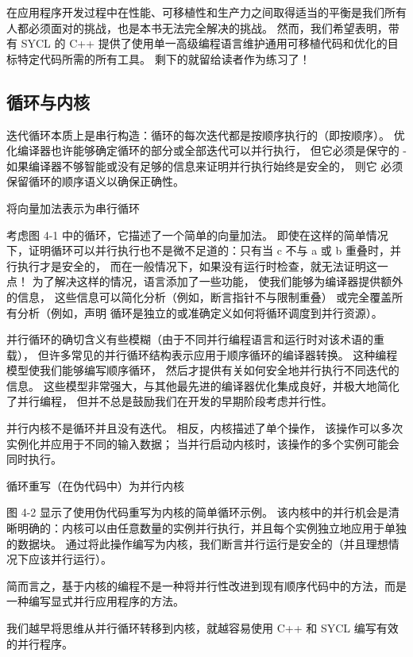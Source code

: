 在应用程序开发过程中在性能、可移植性和生产力之间取得适当的平衡是我们所有人都必须面对的挑战，也是本书无法完全解决的挑战。 
然而，我们希望表明，带有 SYCL 的 C++ 提供了使用单一高级编程语言维护通用可移植代码和优化的目标特定代码所需的所有工具。 
剩下的就留给读者作为练习了！

\subsection{循环与内核}
迭代循环本质上是串行构造：循环的每次迭代都是按顺序执行的（即按顺序）。 
优化编译器也许能够确定循环的部分或全部迭代可以并行执行，
但它必须是保守的 - 如果编译器不够智能或没有足够的信息来证明并行执行始终是安全的，
则它 必须保留循环的顺序语义以确保正确性。

{\color{red} 将向量加法表示为串行循环 }

考虑图 4-1 中的循环，它描述了一个简单的向量加法。 
即使在这样的简单情况下，证明循环可以并行执行也不是微不足道的：只有当 c 不与 a 或 b 重叠时，并行执行才是安全的，
而在一般情况下，如果没有运行时检查，就无法证明这一点！ 为了解决这样的情况，语言添加了一些功能，
使我们能够为编译器提供额外的信息，
这些信息可以简化分析（例如，断言指针不与限制重叠）
或完全覆盖所有分析（例如，声明 循环是独立的或准确定义如何将循环调度到并行资源）。

并行循环的确切含义有些模糊（由于不同并行编程语言和运行时对该术语的重载），
但许多常见的并行循环结构表示应用于顺序循环的编译器转换。 这种编程模型使我们能够编写顺序循环，
然后才提供有关如何安全地并行执行不同迭代的信息。 
这些模型非常强大，与其他最先进的编译器优化集成良好，并极大地简化了并行编程，
但并不总是鼓励我们在开发的早期阶段考虑并行性。

并行内核不是循环并且没有迭代。 相反，内核描述了单个操作，
该操作可以多次实例化并应用于不同的输入数据； 当并行启动内核时，该操作的多个实例可能会同时执行。

{\color{red} 循环重写（在伪代码中）为并行内核}

图 4-2 显示了使用伪代码重写为内核的简单循环示例。 
该内核中的并行机会是清晰明确的：内核可以由任意数量的实例并行执行，并且每个实例独立地应用于单独的数据块。 
通过将此操作编写为内核，我们断言并行运行是安全的（并且理想情况下应该并行运行）。

简而言之，基于内核的编程不是一种将并行性改进到现有顺序代码中的方法，而是一种编写显式并行应用程序的方法。

\begin{remark}
	我们越早将思维从并行循环转移到内核，就越容易使用 C++ 和 SYCL 编写有效的并行程序。
\end{remark}

